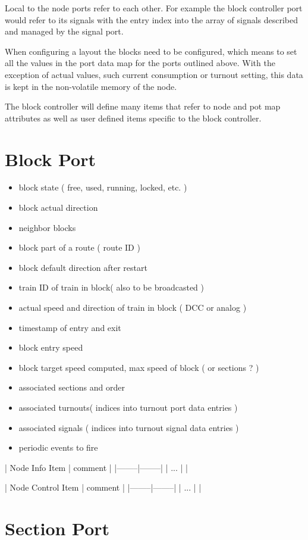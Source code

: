 Local to the node ports refer to each other. For example the block controller port would refer to its signals with the entry index into the array of signals described and managed by the signal port.

When configuring a layout the blocks need to be configured, which means to set all the values in the port data map for the ports outlined above. With the exception of actual values, such current consumption or turnout setting, this data is kept in the non-volatile memory of the node.

The block controller will define many items that refer to node and pot map attributes as well as user defined items specific to the block controller.

\section{Block Port}

\begin{itemize}
\item block state ( free, used, running, locked, etc. )
\item block actual direction
\item neighbor blocks
\item block part of a route ( route ID )
\item block default direction after restart
\item train ID of train in block( also to be broadcasted )
\item actual speed and direction of train in block ( DCC or analog )
\item timestamp of entry and exit
\item block entry speed
\item block target speed computed, max speed of block ( or sections ? )
\item associated sections and order
\item associated turnouts( indices into turnout port data entries )
\item associated signals ( indices into turnout signal data entries )
\item periodic events to fire
\end{itemize}

| Node Info Item | comment |
|--------|--------|
| ... | |

| Node Control Item | comment |
|--------|--------|
| ... | |

\section{Section Port}

